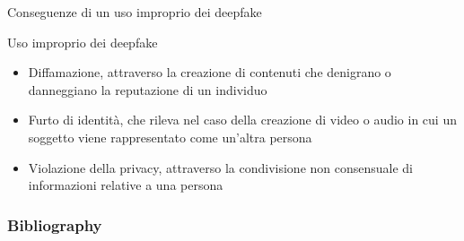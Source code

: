 \documentclass[11pt]{beamer}
\begin{document}
\begin{frame}{Conseguenze di un uso improprio dei deepfake \cite{deepfake_jus}}
\begin{alertblock}{Uso improprio dei deepfake}
\begin{itemize}
\item Diffamazione, attraverso la creazione di contenuti che denigrano o danneggiano la reputazione di un individuo
\item Furto di identità, che rileva nel caso della creazione di video o audio in cui un soggetto viene rappresentato come un’altra persona
\item Violazione della privacy, attraverso la condivisione non consensuale di informazioni relative a una persona
\end{itemize}
\end{alertblock}
\end{frame}



\begin{frame}[t,allowframebreaks]
\frametitle{Bibliography}
\printbibliography
\end{frame}
\end{document}
